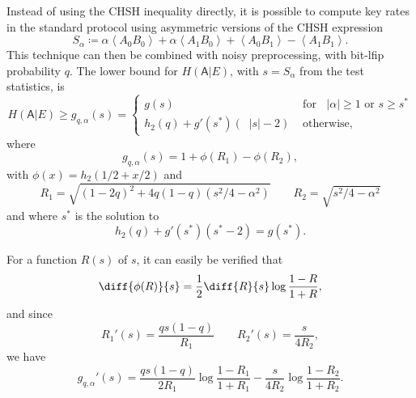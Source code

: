 \documentclass[10pt, a4paper]{article}
\numberwithin{equation}{section} %
\theoremstyle{definition}
\theoremstyle{plain}
\newcommand{\abs}[1]{\mathop{}\left\lvert#1\right\rvert}
\newcommand{\?}{\mathrel{?}} %
\newcommand{\angleb}[1]{\left\langle #1 \right\rangle} %
\newcommand{\crv}[1]{\mathsf{#1}}
\begin{document}
\begin{appendices}
                      Instead of using the CHSH inequality directly, it is possible to compute key rates in the standard protocol using asymmetric versions of the CHSH expression
                      \begin{equation}
                        S_{\alpha} \coloneqq \alpha\angleb{A_0 B_0} + \alpha\angleb{A_1 B_0} + \angleb{A_0 B_1} - \angleb{A_1 B_1}.
                      \end{equation}
                      This technique can then be combined with noisy preprocessing, with bit-lfip probability \(q\). The lower bound for \(H(\crv{A}|E)\), with \(s = S_{\alpha}\) from the test statistics, is
                      \begin{equation} H(\crv{A}|E) \geq g_{q,\alpha}(s) = \begin{cases}
                        g(s) & \text{ for } \abs{\alpha} \geq 1 \text{ or } s \geq s^* \\
                        h_2(q) + g'(s^*)(\abs{s}-2) & \text{ otherwise},
                      \end{cases}
                    \end{equation}
                    where
                    \begin{equation}
                      g_{q,\alpha}(s) = 1 + \phi\left(R_1\right) - \phi\left(R_2\right),
                    \end{equation}
                    with \(\phi(x) = h_2(1/2 + x/2)\) and
                    \begin{equation} 
                      R_1 = \sqrt{{(1-2q)}^2 + 4q(1-q)(s^2/4-\alpha^2)} \qquad R_2 = \sqrt{s^2/4-\alpha^2}
                    \end{equation}
                    and where \(s^*\) is the solution to
                    \begin{equation}\label{eqn:sstar}
                      h_2(q) + g'(s^*) (s^*-2) = g(s^*).
                    \end{equation}

                    For a function \(R(s)\) of \(s\), it can easily be verified that
                    \begin{equation}
                      \diff{\phi(R)}{s} = \frac{1}{2} \diff{R}{s} \log\frac{1-R}{1+R},
                    \end{equation}
                    and since
                    \begin{equation} 
                      R_1'(s) = \frac{qs(1-q)}{R_1} \qquad R_2'(s) = \frac{s}{4R_2},
                    \end{equation}
                    we have
                    \begin{equation}\label{eqn:diffg}
                      g_{q,\alpha}'(s) = \frac{qs(1-q)}{2R_1} \log\frac{1-R_1}{1+R_1} - \frac{s}{4R_2} \log\frac{1-R_2}{1+R_2}.
                    \end{equation}


\end{appendices}
\end{document}
